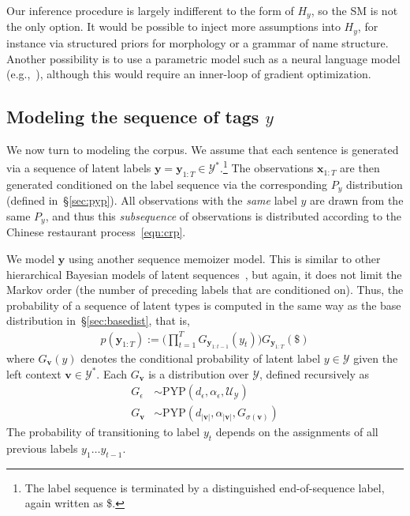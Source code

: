 \documentclass[11pt]{article}
\newcommand{\EOS}{\$}
\begin{document}
Our inference procedure is largely indifferent to the form of $H_y$, so the SM is not the only option.  It would be possible to inject more assumptions into $H_y$, for instance via structured priors for morphology or a grammar of name structure.
Another possibility is to use a parametric model such as a neural language model (e.g.,\ ), although this would require an inner-loop of gradient optimization.

\subsection{Modeling the sequence of tags $y$}\label{sec:context}

We now turn to modeling the corpus.
We assume that each sentence is generated via a sequence of latent labels
$\bm{y} = \bm{y}_{1:T} \in \mathcal{Y}^*$.\footnote{The label sequence is terminated by a
  distinguished end-of-sequence label, again written as \EOS.}
The observations $\bm{x}_{1:T}$ are then generated conditioned on the label sequence via the corresponding $P_y$ distribution (defined in~\S\ref{sec:pyp}). All observations with the {\em same} label $y$ are drawn from the same $P_y$, and thus this {\em subsequence} of observations is distributed according to the Chinese restaurant process~\eqref{eqn:crp}.

We model $\bm{y}$ using another sequence memoizer model.  This is similar to other hierarchical Bayesian models of latent sequences~\cite{goldwater.griffiths:fully,blunsom2011hierarchical}, but again, it does not limit the Markov order (the number of preceding labels that are conditioned on).  Thus, the probability of a sequence of latent types is computed in the same way as the base distribution in~\S\ref{sec:basedist}, that is,
\begin{align}\label{eqn:labelseq}
p(\bm{y}_{1:T}) := \Big( \prod_{t=1}^T G_{\bm{y}_{1:t-1}}(y_t) \Big) G_{\bm{y}_{1:T}}(\EOS)
\end{align}
where $G_{\bm{v}}(y)$ denotes the conditional probability of latent label
$y \in \mathcal{Y}$ given the left context $\bm{v} \in \mathcal{Y}^{*}$.  Each $G_{\mathbf{v}}$ is a distribution over $\mathcal{Y}$, defined recursively as
\begin{align}\label{eqn:G}
  G_{\epsilon} & \sim \mathrm{PYP}(d_\epsilon, \alpha_\epsilon, \mathcal{U}_{\mathcal{Y}}) \\
  G_{\bm{v}} & \sim \mathrm{PYP}(d_{|\mathbf{v}|}, \alpha_{|\mathbf{v}|}, G_{\sigma(\mathbf{v})}) \nonumber
\end{align}
The probability of transitioning
to label $y_t$ depends on the assignments of all previous labels
$y_1 \ldots y_{t-1}$.
\end{document}
